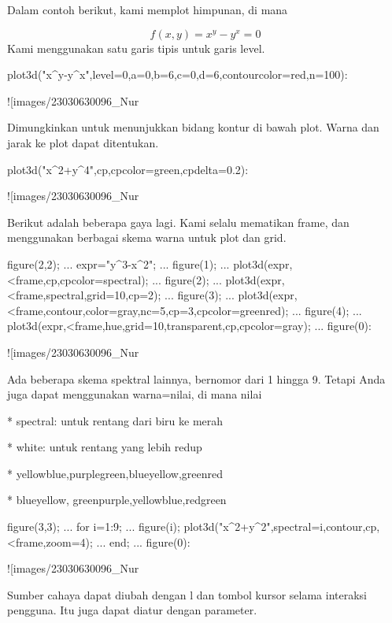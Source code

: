 \documentclass{article}
\begin{document}
Dalam contoh berikut, kami memplot himpunan, di mana


$$f(x,y) = x^y-y^x = 0$$Kami menggunakan satu garis tipis untuk garis level.


\>plot3d("x^y-y^x",level=0,a=0,b=6,c=0,d=6,contourcolor=red,n=100):


![images/23030630096_Nur%

Dimungkinkan untuk menunjukkan bidang kontur di bawah plot. Warna dan
jarak ke plot dapat ditentukan.


\>plot3d("x^2+y^4",\>cp,cpcolor=green,cpdelta=0.2):


![images/23030630096_Nur%

Berikut adalah beberapa gaya lagi. Kami selalu mematikan frame, dan
menggunakan berbagai skema warna untuk plot dan grid.


\>figure(2,2); ...  
\>   expr="y^3-x^2"; ...  
\>   figure(1);  ...  
\>     plot3d(expr,<frame,\>cp,cpcolor=spectral); ...  
\>   figure(2);  ...  
\>     plot3d(expr,<frame,\>spectral,grid=10,cp=2); ...  
\>   figure(3);  ...  
\>     plot3d(expr,<frame,\>contour,color=gray,nc=5,cp=3,cpcolor=greenred); ...  
\>   figure(4);  ...  
\>     plot3d(expr,<frame,\>hue,grid=10,\>transparent,\>cp,cpcolor=gray); ...  
\>   figure(0):


![images/23030630096_Nur%

Ada beberapa skema spektral lainnya, bernomor dari 1 hingga 9. Tetapi
Anda juga dapat menggunakan warna=nilai, di mana nilai


* 
spectral: untuk rentang dari biru ke merah

* 
white: untuk rentang yang lebih redup

* 
yellowblue,purplegreen,blueyellow,greenred

* 
blueyellow, greenpurple,yellowblue,redgreen


\>figure(3,3); ...  
\>   for i=1:9;  ...  
\>     figure(i); plot3d("x^2+y^2",spectral=i,\>contour,\>cp,<frame,zoom=4);  ...  
\>   end; ...  
\>   figure(0):


![images/23030630096_Nur%

Sumber cahaya dapat diubah dengan l dan tombol kursor selama interaksi
pengguna. Itu juga dapat diatur dengan parameter.
\end{document}
